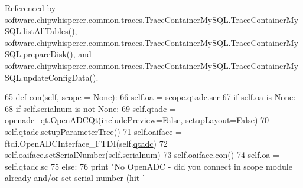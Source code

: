 Referenced by software.\+chipwhisperer.\+common.\+traces.\+Trace\+Container\+My\+S\+Q\+L.\+Trace\+Container\+My\+S\+Q\+L.\+list\+All\+Tables(), software.\+chipwhisperer.\+common.\+traces.\+Trace\+Container\+My\+S\+Q\+L.\+Trace\+Container\+My\+S\+Q\+L.\+prepare\+Disk(), and software.\+chipwhisperer.\+common.\+traces.\+Trace\+Container\+My\+S\+Q\+L.\+Trace\+Container\+My\+S\+Q\+L.\+update\+Config\+Data().


\begin{DoxyCode}
65     \textcolor{keyword}{def }\hyperlink{classsoftware_1_1chipwhisperer_1_1capture_1_1targets_1_1SAKURAG_1_1ChipWhispererComm_adce7a88374360a598223aac43faa4d25}{con}(self, scope = None):
66         self.\hyperlink{classsoftware_1_1chipwhisperer_1_1capture_1_1targets_1_1SAKURAG_1_1ChipWhispererComm_a3a404d2620d6092be22795ff7c4407b5}{oa} = scope.qtadc.ser
67         \textcolor{keywordflow}{if} self.\hyperlink{classsoftware_1_1chipwhisperer_1_1capture_1_1targets_1_1SAKURAG_1_1ChipWhispererComm_a3a404d2620d6092be22795ff7c4407b5}{oa} \textcolor{keywordflow}{is} \textcolor{keywordtype}{None}:
68             \textcolor{keywordflow}{if} self.\hyperlink{classsoftware_1_1chipwhisperer_1_1capture_1_1targets_1_1SAKURAG_1_1ChipWhispererComm_a34b8d52b86106b7013cdeac4cbf9b277}{serialnum} \textcolor{keywordflow}{is} \textcolor{keywordflow}{not} \textcolor{keywordtype}{None}:
69                 self.\hyperlink{classsoftware_1_1chipwhisperer_1_1capture_1_1targets_1_1SAKURAG_1_1ChipWhispererComm_a4a0a888b021ee8a1ae9b19f1e7efcc8c}{qtadc} = openadc\_qt.OpenADCQt(includePreview=\textcolor{keyword}{False}, setupLayout=\textcolor{keyword}{False})
70                 self.qtadc.setupParameterTree()
71                 self.\hyperlink{classsoftware_1_1chipwhisperer_1_1capture_1_1targets_1_1SAKURAG_1_1ChipWhispererComm_a949d1a6a1166eb27cf9209f36059e3f0}{oaiface} = ftdi.OpenADCInterface\_FTDI(self.\hyperlink{classsoftware_1_1chipwhisperer_1_1capture_1_1targets_1_1SAKURAG_1_1ChipWhispererComm_a4a0a888b021ee8a1ae9b19f1e7efcc8c}{qtadc})
72                 self.oaiface.setSerialNumber(self.\hyperlink{classsoftware_1_1chipwhisperer_1_1capture_1_1targets_1_1SAKURAG_1_1ChipWhispererComm_a34b8d52b86106b7013cdeac4cbf9b277}{serialnum})
73                 self.oaiface.con()
74                 self.\hyperlink{classsoftware_1_1chipwhisperer_1_1capture_1_1targets_1_1SAKURAG_1_1ChipWhispererComm_a3a404d2620d6092be22795ff7c4407b5}{oa} = self.qtadc.sc
75             \textcolor{keywordflow}{else}:
76                 \textcolor{keywordflow}{print} \textcolor{stringliteral}{"No OpenADC - did you connect in scope module already and/or set serial number (hit '
}
\end{DoxyCode}

